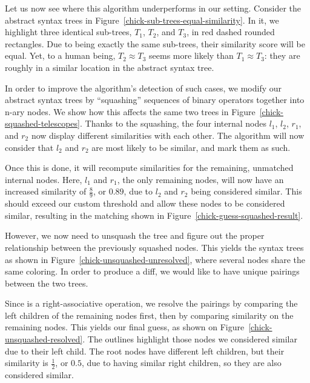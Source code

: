 

Let us now see where this algorithm underperforms in our setting.  Consider the
abstract syntax trees in Figure~\ref{chick-sub-trees-equal-similarity}.  In it,
we highlight three identical sub-trees, $T_{1}$, $T_{2}$, and $T_{3}$, in red
dashed rounded rectangles.  Due to being exactly the same sub-trees, their
similarity score will be equal.  Yet, to a human being, $T_{2} \approx T_{3}$
seems more likely than $T_{1} \approx T_{3}$: they are roughly in a similar
location in the abstract syntax tree.



In order to improve the algorithm's detection of such cases, we modify our
abstract syntax trees by ``squashing'' sequences of binary operators together
into n-ary nodes.  We show how this affects the same two trees in
Figure~\ref{chick-squashed-telescopes}.  Thanks to the squashing, the four
internal nodes $l_{1}$, $l_{2}$, $r_{1}$, and $r_{2}$ now display different
similarities with each other.  The algorithm will now consider that $l_{2}$ and
$r_{2}$ are most likely to be similar, and mark them as such.



Once this is done, it will recompute similarities for the remaining, unmatched
internal nodes.  Here, $l_{1}$ and $r_{1}$, the only remaining nodes, will now
have an increased similarity of $\frac{8}{9}$, or $0.89$, due to $l_{2}$ and
$r_{2}$ being considered similar.  This should exceed our custom threshold and
allow these nodes to be considered similar, resulting in the matching shown in
Figure~\ref{chick-guess-squashed-result}.



However, we now need to unsquash the tree and figure out the proper relationship
between the previously squashed nodes.  This yields the syntax trees as shown in
Figure~\ref{chick-unsquashed-unresolved}, where several nodes share the same
coloring.  In order to produce a diff, we would like to have unique pairings
between the two trees.



Since  is a right-associative operation, we resolve the pairings by
comparing the left children of the remaining nodes first, then by comparing
similarity on the remaining nodes.  This yields our final guess, as shown on
Figure~\ref{chick-unsquashed-resolved}.  The outlines highlight those nodes we
considered similar due to their left child.  The root nodes have different left
children, but their similarity is $\frac{1}{2}$, or $0.5$, due to having similar
right children, so they are also considered similar.

